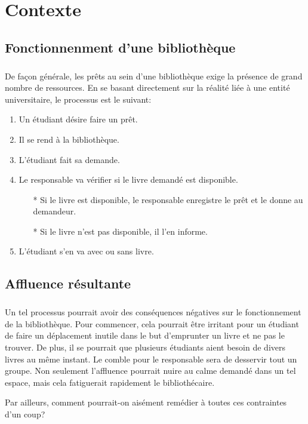 \chapter{Contexte}
    \section{Fonctionnenment d'une bibliothèque}
\paragraph{}
De façon générale, les prêts au sein d'une bibliothèque
exige la présence de grand nombre de ressources. En se 
basant directement sur la réalité liée à une entité
universitaire, le processus est le suivant: \par 
\begin{enumerate}
    \item Un étudiant désire faire un prêt.
    \item Il se rend à la bibliothèque.
    \item L'étudiant fait sa demande.
    \item Le responsable va vérifier si le livre demandé est disponible.
    \begin{itemize}
        \item[*] Si le livre est disponible, le responsable enregistre le prêt 
        et le donne au demandeur.
        \item[*] Si le livre n'est pas disponible, il l'en informe.
    \end{itemize} 
    \item L'étudiant s'en va avec ou sans livre.
\end{enumerate}

    \section{Affluence résultante}
\paragraph{}
Un tel processus pourrait avoir des conséquences négatives
sur le fonctionnement de la bibliothèque. Pour commencer, cela pourrait
être irritant pour un étudiant de faire un déplacement inutile
dans le but d'emprunter un livre et ne pas le trouver. De plus, 
il se pourrait que plusieurs étudiants aient besoin de divers livres
au même instant. Le comble pour le responsable sera de desservir tout 
un groupe. Non seulement l'affluence pourrait nuire au calme demandé
dans un tel espace, mais cela fatiguerait rapidement le bibliothécaire.\par 
Par ailleurs, comment pourrait-on aisément remédier à toutes ces contraintes 
d'un coup?
    
